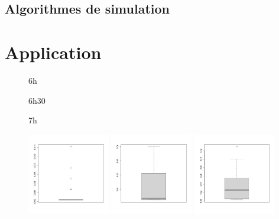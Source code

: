\section{Algorithmes de simulation}



%

\chapter{Application}


\begin{figure}[H]
	\centering
	\begin{minipage}{0.32\textwidth}
		\centering
		6h
	\end{minipage}
	\begin{minipage}{0.32\textwidth}
		\centering
		6h30
	\end{minipage}
	\begin{minipage}{0.32\textwidth}
		\centering
		7h
	\end{minipage}
	\begin{minipage}{\linewidth}
		\centering
		\includegraphics[width=0.32\textwidth]{Images/pv_pre/6h.png}
		\includegraphics[width=0.32\textwidth]{Images/pv_pre/06:30:00.jpg}
		\includegraphics[width=0.32\textwidth]{Images/pv_pre/07:00:00.jpg}

\end{minipage}
\end{figure}
